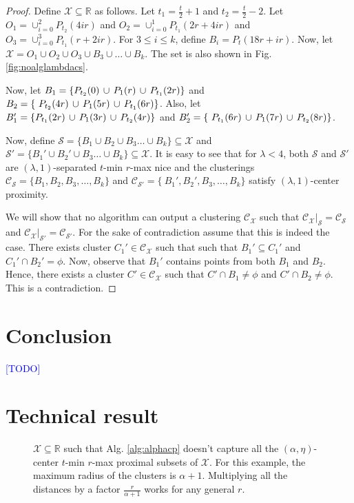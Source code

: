 \documentclass[anon,12pt]{colt2016} %
\newcommand{\mc}{\mathcal}
\newcommand{\todo}{\textcolor{blue}{[TODO]}\xspace}
\begin{document}
\begin{proof}
Define $\mc X \subseteq \mathbb{R}$ as follows. Let $t_1 = \frac{t}{2}+1$ and $t_2 = \frac{t}{2}-2$. Let $O_1 = \cup_{i=0}^2 P_{t_2}(4ir)$ and $O_2 = \cup_{i=0}^1 P_{t_1}(2r+4ir)$ and $O_3 = \cup_{i=0}^3 P_{t_1}(r+2ir)$. For $3\le i\le k$, define $B_i = P_t(18r+ir)$. Now, let $\mc X = O_1 \cup O_2 \cup O_3 \cup B_3 \cup \ldots \cup B_k$. The set is also shown in Fig. \ref{fig:noalglambdacs}.

Now, let $B_1 = \{P_{t_2}(0) \thinspace\cup\thinspace  P_{1}(r) \thinspace\cup\thinspace P_{t_1}(2r) \}$ and $B_2 = \{\ P_{t_2}(4r) \thinspace\cup\thinspace P_{1}(5r)\thinspace\cup\thinspace P_{t_1}(6r)\}$. Also, let $B_1' = \{P_{t_1}(2r) \thinspace\cup\thinspace  P_{1}(3r) \thinspace\cup\thinspace P_{t_2}(4r) \}$ and $B_2' = \{\ P_{t_1}(6r) \thinspace\cup\thinspace P_{1}(7r)\thinspace\cup\thinspace P_{t_2}(8r)\}$.

Now, define $\mc S = \{B_1 \cup B_2 \cup B_3\ldots \cup B_k\} \subseteq \mc X$ and $\mc S' = \{B_1' \cup B_2' \cup B_3\ldots \cup B_k\} \subseteq \mc X$. It is easy to see that for $\lambda < 4$, both $\mc S$ and $\mc S'$ are $(\lambda, 1)$-separated $t$-min $r$-max nice and the clusterings $\mc C_{\mc S} = \{B_1, B_2, B_3, \ldots, B_k\}$ and $\mc C_{\mc S'} = \{\ B_1', B_2', B_3, \ldots, B_k\}$ satisfy $(\lambda, 1)$-center proximity. 

We will show that no algorithm can output a clustering $\mc C_{\mc X}$ such that $\mc C_{\mc X}|_{\mc S} = \mc C_{\mc S}$ and $\mc C_{\mc X}|_{\mc S'} = \mc C_{\mc S'}$. For the sake of contradiction assume that this is indeed the case. There exists cluster $C_1' \in \mc C_{\mc X}$ such that such that $B_1' \subseteq C_1'$ and $C_1' \cap B_2' = \phi$. Now, observe that $B_1'$ contains points from both $B_1$ and $B_2$. Hence, there exists a cluster $C' \in \mc C_{\mc X}$ such that $C' \cap B_1 \neq \phi$ and $C' \cap B_2 \neq \phi$. This is a contradiction.
\end{proof}

\section{Conclusion}
\todo


 


\appendix
\section{Technical result}
\label{appendix:sectiontr}
\begin{figure}

\caption{$\mc X \subseteq \mathbb{R}$ such that Alg. \ref{alg:alphacp} doesn't capture all the $(\alpha, \eta)$-center $t$-min $r$-max proximal subsets of $\mc X$. For this example, the maximum radius of the clusters is $\alpha+1$. Multiplying all the distances by a factor $\frac{r}{\alpha+1}$ works for any general $r$.}
\label{fig:algAlphacp}
\end{figure}
\end{document}
